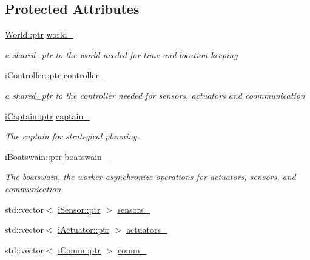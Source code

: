 \subsection*{Protected Attributes}
\begin{DoxyCompactItemize}
\item 
\hyperlink{classo_cpt_1_1_world_aa6e591e3096d5de71e0cec9039663d67}{World\+::ptr} \hyperlink{classo_cpt_1_1_vessel_a332359ea0b37185d1b6e8acc6f50546a}{world\+\_\+}
\begin{DoxyCompactList}\small\item\em a shared\+\_\+ptr to the world needed for time and location keeping \end{DoxyCompactList}\item 
\hyperlink{classo_cpt_1_1i_controller_a6d89a95cd6ad68bb74adfaca2f36370f}{i\+Controller\+::ptr} \hyperlink{classo_cpt_1_1_vessel_a5416b2e16fd2457921fb6c15b45998e0}{controller\+\_\+}
\begin{DoxyCompactList}\small\item\em a shared\+\_\+ptr to the controller needed for sensors, actuators and coommunication \end{DoxyCompactList}\item 
\hyperlink{classo_cpt_1_1i_captain_ae1595d808fa14777c26f1227a82ac4f5}{i\+Captain\+::ptr} \hyperlink{classo_cpt_1_1_vessel_ae135ec01edc448d7973726a78d2a677a}{captain\+\_\+}
\begin{DoxyCompactList}\small\item\em The captain for strategical planning. \end{DoxyCompactList}\item 
\hyperlink{classo_cpt_1_1i_boatswain_ad5e2819c6252955a7eddba4a4c980e3c}{i\+Boatswain\+::ptr} \hyperlink{classo_cpt_1_1_vessel_a7d23ca83ab0b60ced457b6c08ff8f171}{boatswain\+\_\+}
\begin{DoxyCompactList}\small\item\em The boatswain, the worker asynchronize operations for actuators, sensors, and communication. \end{DoxyCompactList}\item 
std\+::vector$<$ \hyperlink{classo_cpt_1_1i_sensor_a03533d2c5dc66e332d70dbb3b5e3006a}{i\+Sensor\+::ptr} $>$ \hyperlink{classo_cpt_1_1_vessel_a7d34053ac8f878e6eeaab2567005c6d5}{sensors\+\_\+}
\item 
std\+::vector$<$ \hyperlink{classo_cpt_1_1i_actuator_a35847799558e92bb84fb6c71de772cac}{i\+Actuator\+::ptr} $>$ \hyperlink{classo_cpt_1_1_vessel_a9ca55a7aa5444fcaed183ebe9861198d}{actuators\+\_\+}
\item 
std\+::vector$<$ \hyperlink{classo_cpt_1_1i_comm_af0c655f143251b7d03fcd98f89637228}{i\+Comm\+::ptr} $>$ \hyperlink{classo_cpt_1_1_vessel_a0f09f5d34963356faa3834b379e8081e}{comm\+\_\+}
\end{DoxyCompactItemize}
